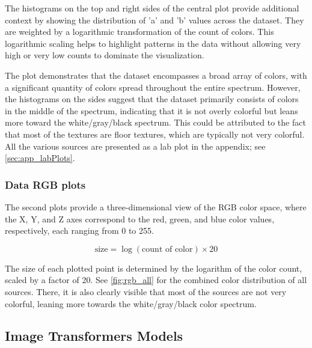     The histograms on the top and right sides of the central plot provide additional context by showing the distribution of 'a' and 'b' values across the dataset. They are weighted by a logarithmic transformation of the count of colors. This logarithmic scaling helps to highlight patterns in the data without allowing very high or very low counts to dominate the visualization.

    The plot demonstrates that the dataset encompasses a broad array of colors, with a significant quantity of colors spread throughout the entire spectrum. However, the histograms on the sides suggest that the dataset primarily consists of colors in the middle of the spectrum, indicating that it is not overly colorful but leans more toward the white/gray/black spectrum. This could be attributed to the fact that most of the textures are floor textures, which are typically not very colorful. All the various sources are presented as a lab plot in the appendix; see \autoref{sec:app_labPlots}.

    \subsubsection{Data RGB plots}

    The second plots provide a three-dimensional view of the RGB color space, where the X, Y, and Z axes correspond to the red, green, and blue color values, respectively, each ranging from 0 to 255. 

    \[
    \text{size} = \log(\text{count of color}) \times 20
    \]

    The size of each plotted point is determined by the logarithm of the color count, scaled by a factor of 20. See \autoref{fig:rgb_all} for the combined color distribution of all sources. There, it is also clearly visible that most of the sources are not very colorful, leaning more towards the white/gray/black color spectrum.



\newpage
\subsection{Image Transformers Models}
    
